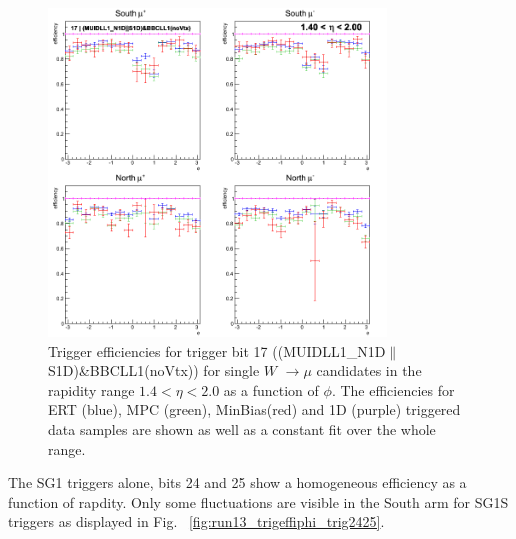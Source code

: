 \begin{figure}[h!]

  \centering
  \centering
  \includegraphics[width=0.8\textwidth]{./figures/run13_trigeffiphi_eta1_trig17_lin.png}
  \caption{
    Trigger efficiencies for trigger bit 17
    ((MUIDLL1\_N1D$\|$S1D)\&BBCLL1(noVtx)) for single $W$ $\rightarrow \mu$
    candidates in the rapidity range $ 1.4 < \eta < 2.0$ as a function of
    $\phi$. The efficiencies for ERT (blue), MPC (green), MinBias(red) and 1D
    (purple) triggered data samples are shown as well as a constant fit over the
    whole range.
  }
  \label{fig:run13_trigeffiphi_trig17} 
\end{figure}
\clearpage

The SG1 triggers alone, bits 24 and 25 show a homogeneous efficiency as a
function of rapdity. Only some fluctuations are visible in the South arm for
SG1S triggers as displayed in Fig.~ \ref{fig:run13_trigeffiphi_trig2425}.  

